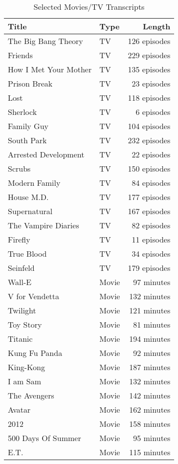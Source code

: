 \begin{table}[th]
\caption{Selected Movies/TV Transcripts}
\label{tab:scripts}
\centering
\small
\begin{tabular}{llr}
\toprule
Title & Type & Length\\
\bottomrule
\rowcolor[gray]{.8} The Big Bang Theory & TV & 126 episodes  \\
					Friends & TV & 229 episodes  \\
\rowcolor[gray]{.8} How I Met Your Mother & TV & 135 episodes  \\
					Prison Break & TV & 23 episodes  \\
\rowcolor[gray]{.8} Lost & TV & 118 episodes  \\
					Sherlock & TV & 6 episodes  \\
\rowcolor[gray]{.8} Family Guy & TV & 104 episodes  \\
					South Park & TV & 232 episodes  \\
\rowcolor[gray]{.8} Arrested Development & TV & 22 episodes  \\
					Scrubs & TV & 150 episodes  \\
\rowcolor[gray]{.8} Modern Family & TV & 84 episodes  \\
					House M.D. & TV & 177 episodes  \\
\rowcolor[gray]{.8} Supernatural & TV & 167 episodes  \\
					The Vampire Diaries & TV & 82 episodes  \\
\rowcolor[gray]{.8} Firefly & TV & 11 episodes  \\
					True Blood & TV & 34 episodes  \\
\rowcolor[gray]{.8} Seinfeld & TV & 179 episodes  \\
					Wall-E & Movie & 97 minutes  \\
\rowcolor[gray]{.8} V for Vendetta & Movie & 132 minutes  \\
					Twilight & Movie & 121 minutes  \\
\rowcolor[gray]{.8} Toy Story & Movie & 81 minutes  \\
					Titanic & Movie & 194 minutes  \\
\rowcolor[gray]{.8} Kung Fu Panda & Movie & 92 minutes  \\
					King-Kong & Movie & 187 minutes  \\
\rowcolor[gray]{.8} I am Sam & Movie & 132 minutes  \\
					The Avengers & Movie & 142 minutes \\
\rowcolor[gray]{.8} Avatar & Movie & 162 minutes  \\
					2012 & Movie & 158 minutes  \\
\rowcolor[gray]{.8} 500 Days Of Summer & Movie & 95 minutes \\
					E.T. & Movie & 115 minutes  \\
\bottomrule
\end{tabular}
\end{table}

